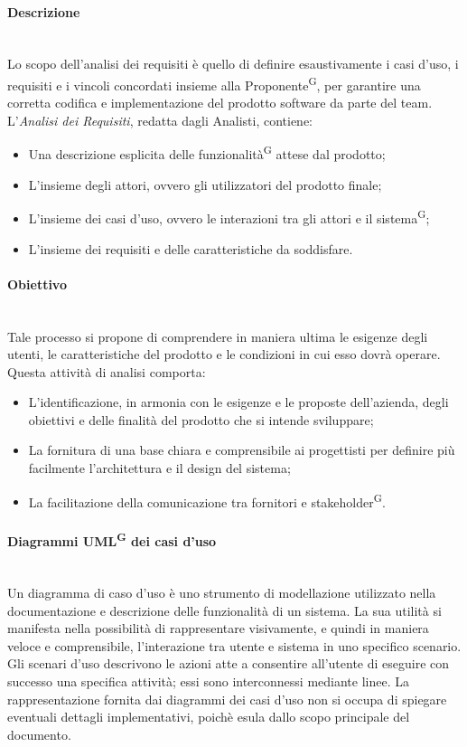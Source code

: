 \documentclass[8pt]{article}
\newcommand{\glossterm}[1]{#1\textsuperscript{G}} %
\newcommand{\subsubsubsection}[1]{\paragraph{#1}\mbox{}\\}
\begin{document}
\subsubsubsection{Descrizione}
Lo scopo dell'analisi dei requisiti è quello di definire esaustivamente i casi d'uso, i requisiti e i vincoli concordati insieme alla \glossterm{Proponente}, per garantire una corretta codifica e implementazione del prodotto software da parte del team.\\
L'\textit{Analisi dei Requisiti}, redatta dagli Analisti, contiene:
\begin{itemize}
    \item Una descrizione esplicita delle \glossterm{funzionalità} attese dal prodotto;
    \item L'insieme degli attori, ovvero gli utilizzatori del prodotto finale;
    \item L'insieme dei casi d'uso, ovvero le interazioni tra gli attori e il \glossterm{sistema};
    \item L'insieme dei requisiti e delle caratteristiche da soddisfare.
\end{itemize}
\subsubsubsection{Obiettivo}
Tale processo si propone di comprendere in maniera ultima le esigenze degli utenti, le caratteristiche del prodotto e le condizioni in cui esso dovrà operare.\\
Questa attività di analisi comporta:
\begin{itemize}
    \item L'identificazione, in armonia con le esigenze e le proposte dell'azienda, degli obiettivi e delle finalità del prodotto che si intende sviluppare;
    \item La fornitura di una base chiara e comprensibile ai progettisti per definire più facilmente l'architettura e il design del sistema;
    \item La facilitazione della comunicazione tra fornitori e \glossterm{stakeholder}.
\end{itemize}
\subsubsubsection{Diagrammi \glossterm{UML} dei casi d'uso}
Un diagramma di caso d'uso è uno strumento di modellazione utilizzato nella documentazione e descrizione delle funzionalità di un sistema. La sua utilità si manifesta nella possibilità di rappresentare visivamente, e quindi in maniera veloce e comprensibile, l'interazione tra utente e sistema in uno specifico scenario. Gli scenari d'uso descrivono le azioni atte a consentire all'utente di eseguire con successo una specifica attività; essi sono interconnessi mediante linee. La rappresentazione fornita dai diagrammi dei casi d'uso non si occupa di spiegare eventuali dettagli implementativi, poichè esula dallo scopo principale del documento.\\
\end{document}
